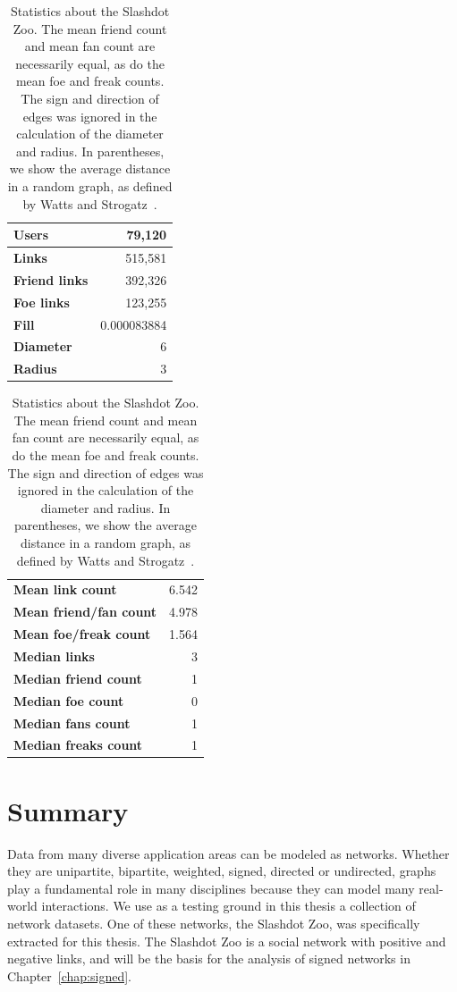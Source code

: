 \documentclass[11pt,a4paper]{book}
\begin{document}
\begin{table}
  \centering
  \caption{
    Statistics about the Slashdot Zoo.  The mean
    friend count and mean fan count are necessarily equal, as do the mean
    foe and freak counts.
    The sign and direction of edges was ignored
    in the calculation of the diameter and radius.
    In parentheses, we show the average distance in a random graph, as
    defined by Watts and Strogatz~\cite{b228}.
  }
  \label{tab:zoo-stat}
  \begin{tabular}{ l r }
    \toprule
    \textbf{Users} & 79,120 \\
    \midrule
    \textbf{Links} & 515,581 \\
    \textbf{Friend links} & 392,326 \\
    \textbf{Foe links} & 123,255 \\
    \midrule
    \textbf{Fill} & 0.000083884 \\
    \midrule
    \textbf{Diameter} & 6 \\
    \textbf{Radius}  & 3 \\
    \bottomrule
  \end{tabular}
  \qquad
  \begin{tabular}{lr}
    \toprule
    \textbf{Mean link count} & 6.542 \\
    \textbf{Mean friend/fan count} & 4.978 \\
    \textbf{Mean foe/freak count} &  1.564 \\
    \midrule
    \textbf{Median links} & 3 \\
    \textbf{Median friend count} & 1 \\
    \textbf{Median foe count} & 0 \\
    \textbf{Median fans count} & 1 \\
    \textbf{Median freaks count} & 1 \\
    \bottomrule
  \end{tabular}
\end{table}

\section{Summary}
Data from many diverse application areas can be modeled as networks. 
Whether they are
unipartite, bipartite, weighted, signed, directed or undirected, graphs
play a fundamental role in many disciplines because 
they can model many real-world interactions.  
We use as a testing ground in this thesis 
a collection of network datasets. One of
these networks, the Slashdot Zoo, was specifically extracted for 
this thesis.  The Slashdot Zoo is 
a social network with positive and negative links, and will be the
basis for the analysis of 
signed networks in Chapter~\ref{chap:signed}.
\end{document}
